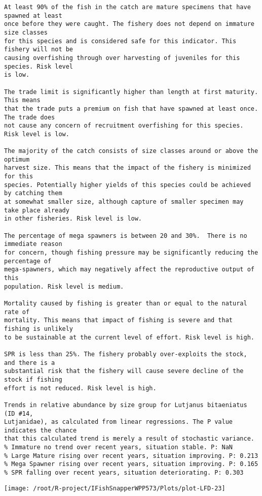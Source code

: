 \documentclass{report}\usepackage[]{graphicx}\usepackage[]{color}
\makeatletter
\def\maxwidth{ %
  \ifdim\Gin@nat@width>\linewidth
    \linewidth
  \else
    \Gin@nat@width
  \fi
}
\newenvironment{kframe}{%
 \def\at@end@of@kframe{}%
 \ifinner\ifhmode%
  \def\at@end@of@kframe{\end{minipage}}%
  \begin{minipage}{\columnwidth}%
 \fi\fi%
 \def\FrameCommand##1{\hskip\@totalleftmargin \hskip-\fboxsep
 \colorbox{shadecolor}{##1}\hskip-\fboxsep
     \hskip-\linewidth \hskip-\@totalleftmargin \hskip\columnwidth}%
 \MakeFramed {\advance\hsize-\width
   \@totalleftmargin\z@ \linewidth\hsize
   \@setminipage}}%
 {\par\unskip\endMakeFramed%
 \at@end@of@kframe}
\newenvironment{knitrout}{}{} %
\makeatother
\begin{document}
\begin{knitrout}
\begin{kframe}
\begin{verbatim}
At least 90% of the fish in the catch are mature specimens that have spawned at least
once before they were caught. The fishery does not depend on immature size classes
for this species and is considered safe for this indicator. This fishery will not be
causing overfishing through over harvesting of juveniles for this species. Risk level
is low.

The trade limit is significantly higher than length at first maturity.  This means
that the trade puts a premium on fish that have spawned at least once. The trade does
not cause any concern of recruitment overfishing for this species. Risk level is low.

The majority of the catch consists of size classes around or above the optimum
harvest size. This means that the impact of the fishery is minimized for this
species. Potentially higher yields of this species could be achieved by catching them
at somewhat smaller size, although capture of smaller specimen may take place already
in other fisheries. Risk level is low.

The percentage of mega spawners is between 20 and 30%.  There is no immediate reason
for concern, though fishing pressure may be significantly reducing the percentage of
mega-spawners, which may negatively affect the reproductive output of this
population. Risk level is medium.
 
Mortality caused by fishing is greater than or equal to the natural rate of
mortality. This means that impact of fishing is severe and that fishing is unlikely
to be sustainable at the current level of effort. Risk level is high.
 
SPR is less than 25%. The fishery probably over-exploits the stock, and there is a
substantial risk that the fishery will cause severe decline of the stock if fishing
effort is not reduced. Risk level is high.
 
Trends in relative abundance by size group for Lutjanus bitaeniatus (ID #14,
Lutjanidae), as calculated from linear regressions. The P value indicates the chance
that this calculated trend is merely a result of stochastic variance.
% Immature no trend over recent years, situation stable. P: NaN
% Large Mature rising over recent years, situation improving. P: 0.213
% Mega Spawner rising over recent years, situation improving. P: 0.165
% SPR falling over recent years, situation deteriorating. P: 0.303
\end{verbatim}
\end{kframe}
\texttt{[image: /root/R-project/IFishSnapperWPP573/Plots/plot-LFD-23]} 


\end{knitrout}
\end{document}
